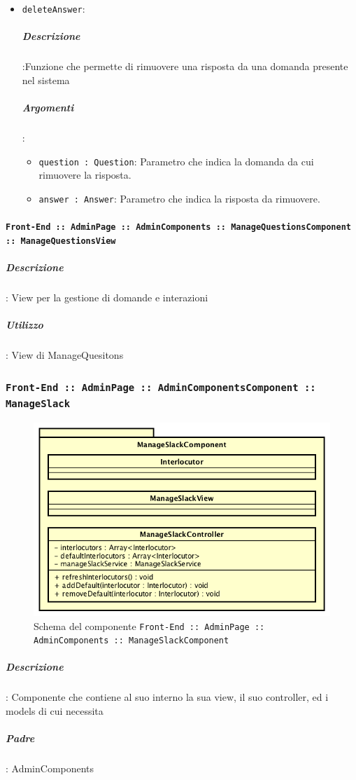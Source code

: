 \documentclass[../DefinizioneDiProdotto_v2.0.0.tex]{subfiles}
\begin{document}
\begin{itemize}
							\item \texttt{deleteAnswer}:
							\subparagraph{Descrizione}:Funzione che permette di rimuovere una risposta da una domanda presente nel sistema
							\subparagraph{Argomenti}:
							\begin{itemize}
								\item \texttt{question : Question}: Parametro che indica la domanda da cui rimuovere la risposta.
								\item \texttt{answer : Answer}: Parametro che indica la risposta da rimuovere.
							\end{itemize}
					\end{itemize}
					\paragraph{\texttt{Front-End :: AdminPage :: AdminComponents :: ManageQuestionsComponent :: ManageQuestionsView}}
						\subparagraph{Descrizione}: View per la gestione di domande e interazioni
						\subparagraph{Utilizzo}: View di ManageQuesitons

	\newpage
	\subsubsection{\texttt{Front-End :: AdminPage :: AdminComponentsComponent :: ManageSlack}}
	\begin{figure}[!h]
		\centering
		\includegraphics[scale=0.6]{Architettura/Front-End/AdminPage/AdminComponents/ManageSlackComponent.png}
		\caption{Schema del componente \texttt{Front-End :: AdminPage :: AdminComponents :: ManageSlackComponent}}
	\end{figure}
			\subparagraph{Descrizione}: Componente che contiene al suo interno la sua view, il suo controller, ed i models di cui necessita
			\subparagraph{Padre}: AdminComponents
\end{document}
